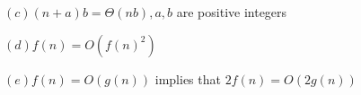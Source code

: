 \documentclass[letterpaper,portrait,12pt]{article}
\begin{document}
\begin{flushleft}

\end{flushleft}


\begin{flushleft}

\end{flushleft}


\begin{flushleft}
$(c) (n + a)b = \Theta(nb ), a, b$ are positive integers
\end{flushleft}


\begin{flushleft}

\end{flushleft}


\begin{flushleft}

\end{flushleft}


\begin{flushleft}
$(d) f (n) = O(f (n)^2 )$
\end{flushleft}


\begin{flushleft}

\end{flushleft}


\begin{flushleft}

\end{flushleft}


\begin{flushleft}

\end{flushleft}


\begin{flushleft}

\end{flushleft}


\begin{flushleft}

\end{flushleft}


\begin{flushleft}

\end{flushleft}


\begin{flushleft}
$(e) f (n) = O(g(n))$ implies that $2f (n) = O(2g(n) )$
\end{flushleft}


\begin{flushleft}

\end{flushleft}
\end{document}
